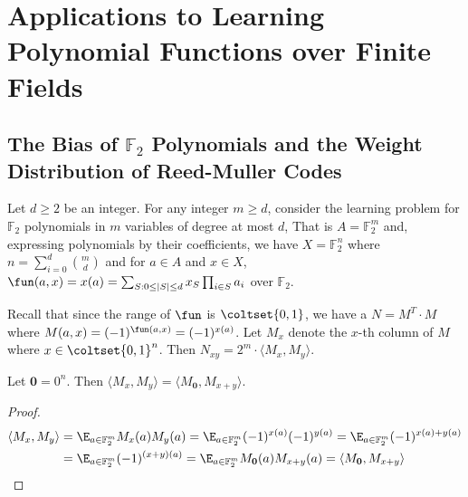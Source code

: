 \newcommand{\w}{\textrm{weight}}
\section{Applications to Learning Polynomial Functions over Finite Fields}

\subsection{The Bias of $\mathbb{F}_2$ Polynomials and the Weight Distribution of Reed-Muller Codes}
\label{sec:f2-reed-muller}

Let $d\ge 2$ be an integer.  For any integer $m\ge d$, consider the learning
problem for $\mathbb{F}_2$ polynomials in $m$ variables of degree at most $d$, 
That is $A=\mathbb{F}_2^m$ and, expressing polynomials by their coefficients,
we have $X=\mathbb{F}_2^n$ where $n=\sum_{i=0}^d \binom{m}{d}$ and
for $a\in A$ and $x\in X$,
$\fun (a,x)=x(a)=\sum_{S: 0\leq |S|\leq d} x_S \prod_{i\in S} a_i$ over
$\mathbb{F}_2$.

Recall that since the range of $\fun$ is $\coltset{0,1}$,
we have a $N=M^T\cdot M$ 
where $M(a,x)=(-1)^{\fun(a,x)}=(-1)^{x(a)}$.
Let $M_x$ denote the $x$-th column of $M$ where $x\in \coltset{0,1}^n$.
Then $N_{xy}=2^m \cdot \langle M_x,M_y\rangle$.

\begin{proposition}
\label{prop:equalrows}
Let $\mathbf{0}=0^n$.
Then $\langle M_x,M_y\rangle=\langle M_{\mathbf{0}},M_{x+y}\rangle$.
\end{proposition}

\begin{proof}
\begin{align*}
\langle M_x,M_y\rangle&=\E_{a\in \mathbb{F}_2^m} M_x(a)M_y(a)
=\E_{a\in \mathbb{F}_2^m} (-1)^{x(a)}(-1)^{y(a)}
=\E_{a\in \mathbb{F}_2^m} (-1)^{x(a)+y(a)}\\
&=\E_{a\in \mathbb{F}_2^m} (-1)^{(x+y)(a)}
=\E_{a\in \mathbb{F}_2^m} M_{\mathbf{0}}(a)M_{x+y}(a)
=\langle M_{\mathbf{0}},M_{x+y}\rangle
\end{align*}
\end{proof}

